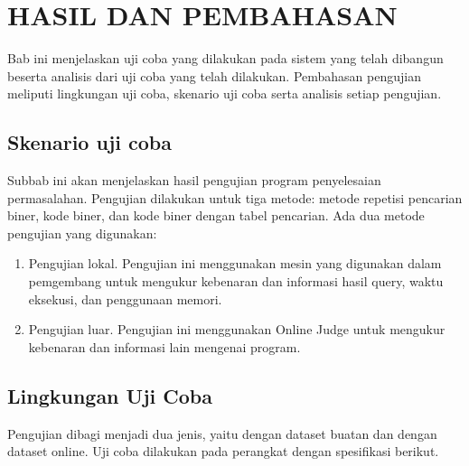 \chapter{HASIL DAN PEMBAHASAN}

Bab ini menjelaskan uji coba yang dilakukan pada sistem yang telah dibangun beserta analisis dari uji coba yang telah dilakukan. Pembahasan pengujian meliputi lingkungan uji coba, skenario uji coba serta analisis setiap pengujian.

\section{Skenario uji coba}

Subbab ini akan menjelaskan hasil pengujian program penyelesaian permasalahan. Pengujian dilakukan untuk tiga metode: metode repetisi pencarian biner, kode biner, dan kode biner dengan tabel pencarian. Ada dua metode pengujian yang digunakan:

\begin{enumerate}
  \item Pengujian lokal. Pengujian ini menggunakan mesin yang digunakan dalam pemgembang untuk mengukur kebenaran dan informasi hasil query, waktu eksekusi, dan penggunaan memori.
  \item Pengujian luar. Pengujian ini menggunakan Online Judge untuk mengukur kebenaran dan informasi lain mengenai program.
\end{enumerate}

\section{Lingkungan Uji Coba}

Pengujian dibagi menjadi dua jenis, yaitu dengan dataset buatan dan dengan dataset online. Uji coba dilakukan pada perangkat dengan spesifikasi berikut.

